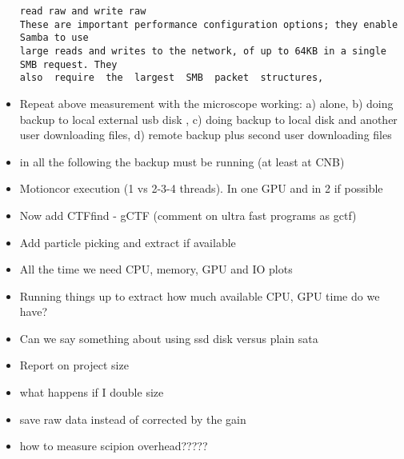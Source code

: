 \begin{itemize}
\begin{verbatim}
read raw and write raw
These are important performance configuration options; they enable Samba to use
large reads and writes to the network, of up to 64KB in a single SMB request. They
also  require  the  largest  SMB  packet  structures,

\end{verbatim}

    
    \item Repeat above measurement with the  microscope working: a) alone, b) doing backup to local external usb disk , c) doing backup to local disk and another user downloading files, d) remote backup plus second user downloading files
   
   \item in all the following the backup must be running (at least at CNB)
   
   \item Motioncor execution (1 vs 2-3-4 threads). In one GPU and in 2 if possible
   
   \item Now add CTFfind - gCTF (comment on ultra fast programs as gctf)
   
   \item Add particle picking and extract if available
   
   \item All the time we need CPU, memory, GPU and IO plots
      
   \item Running things up to extract  how much available CPU, GPU time do we have?
   
   \item Can we say something about using ssd disk versus plain sata
   
   \item Report on project size
   
   \item what happens if I double size
   
   \item save raw data instead of corrected by the gain
   
   \item how to measure scipion overhead?????
   

\end{itemize}

